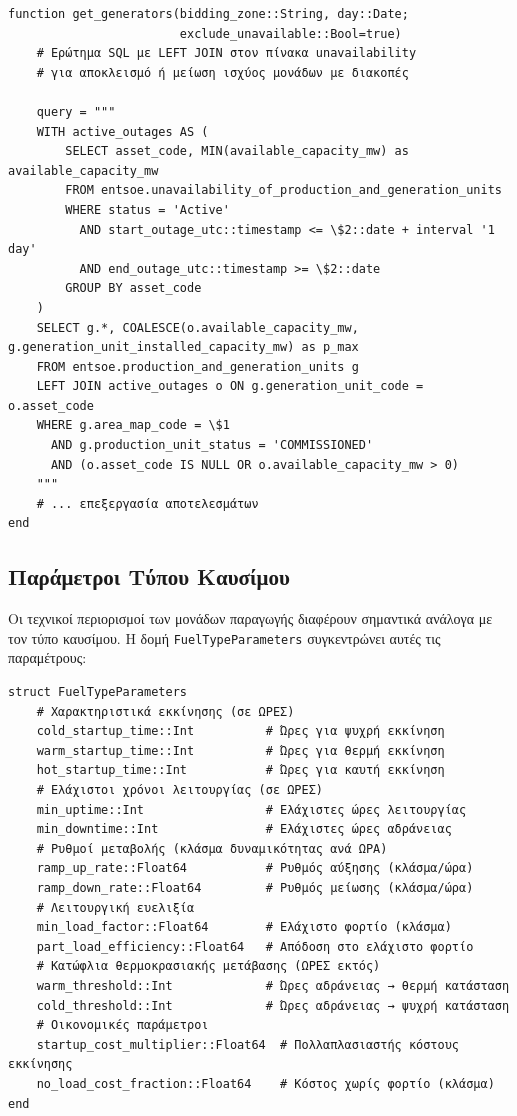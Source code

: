 \begin{samepage}
\begin{verbatim}
function get_generators(bidding_zone::String, day::Date; 
                        exclude_unavailable::Bool=true)
    # Ερώτημα SQL με LEFT JOIN στον πίνακα unavailability
    # για αποκλεισμό ή μείωση ισχύος μονάδων με διακοπές
    
    query = """
    WITH active_outages AS (
        SELECT asset_code, MIN(available_capacity_mw) as available_capacity_mw
        FROM entsoe.unavailability_of_production_and_generation_units
        WHERE status = 'Active'
          AND start_outage_utc::timestamp <= \$2::date + interval '1 day'
          AND end_outage_utc::timestamp >= \$2::date
        GROUP BY asset_code
    )
    SELECT g.*, COALESCE(o.available_capacity_mw, g.generation_unit_installed_capacity_mw) as p_max
    FROM entsoe.production_and_generation_units g
    LEFT JOIN active_outages o ON g.generation_unit_code = o.asset_code
    WHERE g.area_map_code = \$1
      AND g.production_unit_status = 'COMMISSIONED'
      AND (o.asset_code IS NULL OR o.available_capacity_mw > 0)
    """
    # ... επεξεργασία αποτελεσμάτων
end
\end{verbatim}
\end{samepage}

\subsection{Παράμετροι Τύπου Καυσίμου}
\label{subsec:fuel-type-parameters}

Οι τεχνικοί περιορισμοί των μονάδων παραγωγής διαφέρουν σημαντικά ανάλογα με τον τύπο καυσίμου. Η δομή \texttt{FuelTypeParameters} συγκεντρώνει αυτές τις παραμέτρους:

\begin{samepage}
\begin{verbatim}
struct FuelTypeParameters
    # Χαρακτηριστικά εκκίνησης (σε ΩΡΕΣ)
    cold_startup_time::Int          # Ώρες για ψυχρή εκκίνηση
    warm_startup_time::Int          # Ώρες για θερμή εκκίνηση
    hot_startup_time::Int           # Ώρες για καυτή εκκίνηση
    # Ελάχιστοι χρόνοι λειτουργίας (σε ΩΡΕΣ)
    min_uptime::Int                 # Ελάχιστες ώρες λειτουργίας
    min_downtime::Int               # Ελάχιστες ώρες αδράνειας
    # Ρυθμοί μεταβολής (κλάσμα δυναμικότητας ανά ΩΡΑ)
    ramp_up_rate::Float64           # Ρυθμός αύξησης (κλάσμα/ώρα)
    ramp_down_rate::Float64         # Ρυθμός μείωσης (κλάσμα/ώρα)
    # Λειτουργική ευελιξία
    min_load_factor::Float64        # Ελάχιστο φορτίο (κλάσμα)
    part_load_efficiency::Float64   # Απόδοση στο ελάχιστο φορτίο
    # Κατώφλια θερμοκρασιακής μετάβασης (ΩΡΕΣ εκτός)
    warm_threshold::Int             # Ώρες αδράνειας → θερμή κατάσταση
    cold_threshold::Int             # Ώρες αδράνειας → ψυχρή κατάσταση
    # Οικονομικές παράμετροι
    startup_cost_multiplier::Float64  # Πολλαπλασιαστής κόστους εκκίνησης
    no_load_cost_fraction::Float64    # Κόστος χωρίς φορτίο (κλάσμα)
end
\end{verbatim}
\end{samepage}

